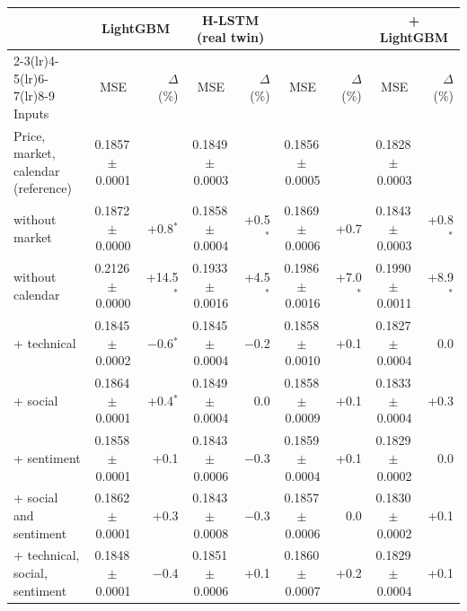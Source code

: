 \begin{tabular}{@{}lcrcrcrcr@{}}
\toprule
 & \multicolumn{2}{c}{LightGBM} & \multicolumn{2}{c}{H-LSTM (real twin)} & \multicolumn{2}{c}{\HQ{}} & \multicolumn{2}{c}{\HQ{} + LightGBM} \\
\cmidrule(lr){2-3}\cmidrule(lr){4-5}\cmidrule(lr){6-7}\cmidrule(lr){8-9}
Inputs & MSE & $\Delta$ (\%) & MSE & $\Delta$ (\%) & MSE & $\Delta$ (\%) & MSE & $\Delta$ (\%) \\
\midrule
Price, market, calendar (reference) & 0.1857\,$\pm$\,0.0001 &  & 0.1849\,$\pm$\,0.0003 &  & 0.1856\,$\pm$\,0.0005 &  & 0.1828\,$\pm$\,0.0003 &  \\
\addlinespace[2pt]
\quad without market & 0.1872\,$\pm$\,0.0000 & +0.8$^{*}$ & 0.1858\,$\pm$\,0.0004 & +0.5$^{*}$ & 0.1869\,$\pm$\,0.0006 & +0.7 & 0.1843\,$\pm$\,0.0003 & +0.8$^{*}$ \\
\quad without calendar & 0.2126\,$\pm$\,0.0000 & +14.5$^{*}$ & 0.1933\,$\pm$\,0.0016 & +4.5$^{*}$ & 0.1986\,$\pm$\,0.0016 & +7.0$^{*}$ & 0.1990\,$\pm$\,0.0011 & +8.9$^{*}$ \\
\quad + technical & 0.1845\,$\pm$\,0.0002 & $-$0.6$^{*}$ & 0.1845\,$\pm$\,0.0004 & $-$0.2 & 0.1858\,$\pm$\,0.0010 & +0.1 & 0.1827\,$\pm$\,0.0004 & 0.0 \\
\quad + social & 0.1864\,$\pm$\,0.0001 & +0.4$^{*}$ & 0.1849\,$\pm$\,0.0004 & 0.0 & 0.1858\,$\pm$\,0.0009 & +0.1 & 0.1833\,$\pm$\,0.0004 & +0.3 \\
\quad + sentiment & 0.1858\,$\pm$\,0.0001 & +0.1 & 0.1843\,$\pm$\,0.0006 & $-$0.3 & 0.1859\,$\pm$\,0.0004 & +0.1 & 0.1829\,$\pm$\,0.0002 & 0.0 \\
\quad + social and sentiment & 0.1862\,$\pm$\,0.0001 & +0.3 & 0.1843\,$\pm$\,0.0008 & $-$0.3 & 0.1857\,$\pm$\,0.0006 & 0.0 & 0.1830\,$\pm$\,0.0002 & +0.1 \\
\quad + technical, social, sentiment & 0.1848\,$\pm$\,0.0001 & $-$0.4 & 0.1851\,$\pm$\,0.0006 & +0.1 & 0.1860\,$\pm$\,0.0007 & +0.2 & 0.1829\,$\pm$\,0.0004 & +0.1 \\
\bottomrule
\end{tabular}
